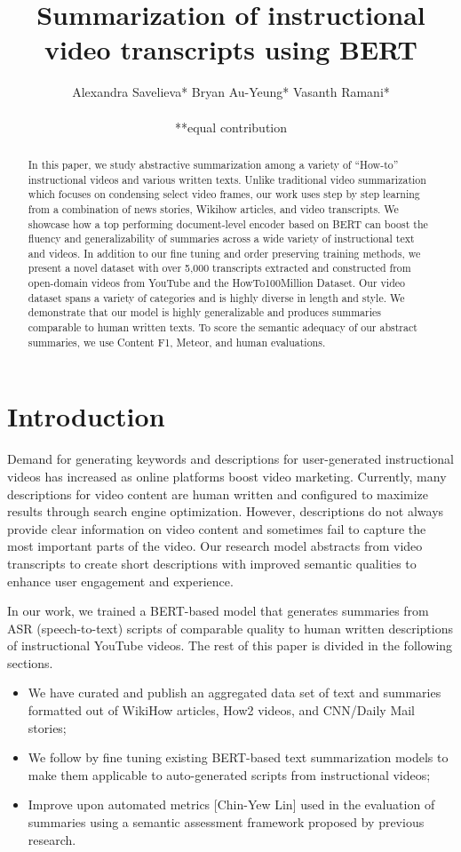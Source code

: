 \documentclass{article}
\title{Summarization of instructional video transcripts using BERT}
\author{%
 
  Alexandra Savelieva*\And
  Bryan Au-Yeung*\And
  Vasanth Ramani* \\
\\
**equal contribution 

}
\begin{document}
\maketitle

\begin{abstract}
In this paper, we study abstractive summarization among a variety of “How-to” instructional videos and various written texts. Unlike traditional video summarization which focuses on condensing select video frames, our work uses step by step learning from a combination of news stories, Wikihow articles, and video transcripts. We showcase how a top performing document-level encoder based on BERT can boost the fluency and generalizability of summaries across a wide variety of instructional text and videos. In addition to our fine tuning and order preserving training methods, we present a novel dataset with over 5,000 transcripts extracted and constructed from open-domain videos from YouTube and the HowTo100Million Dataset. Our video dataset spans a variety of categories and is highly diverse in length and style. We demonstrate that our model is highly generalizable and produces summaries comparable to human written texts. To score the semantic adequacy of our abstract summaries, we use Content F1, Meteor, and human evaluations.
\end{abstract}

\section{Introduction}
 
Demand for generating keywords and descriptions for user-generated instructional videos has increased as online platforms boost video marketing. Currently, many descriptions for video content are human written and configured to maximize results through search engine optimization. However, descriptions do not always provide clear information on video content and sometimes fail to capture the most important parts of the video. Our research model abstracts from video transcripts to create short descriptions with improved semantic qualities to enhance user engagement and experience.

In our work, we trained a BERT-based model that generates summaries from ASR (speech-to-text) scripts of comparable quality to human written descriptions of instructional YouTube videos. The rest of this paper is divided in the following sections.

\begin{itemize}

\item We have curated and publish an aggregated data set of text and summaries formatted out of WikiHow articles, How2 videos, and CNN/Daily Mail stories;
\item We follow by fine tuning existing BERT-based text summarization models to make them applicable to auto-generated scripts from instructional videos; 
\item Improve upon automated metrics [Chin-Yew Lin] used in the evaluation of summaries using a semantic assessment framework proposed by previous research.
\end{itemize}
\end{document}
